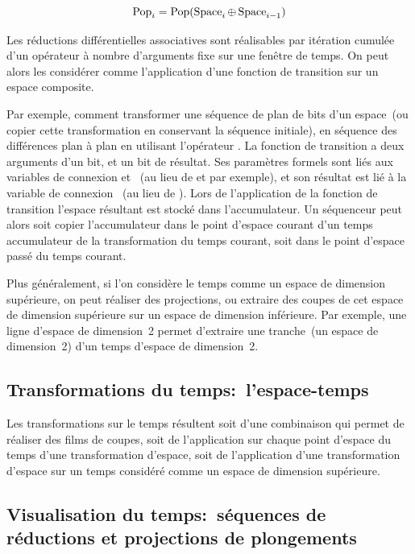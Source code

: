 \[\operatorname{Pop}_{i}=\operatorname{Pop}(\operatorname{Space}_{i}\oplus\operatorname{Space}_{i-1})\]

Les réductions différentielles associatives sont réalisables par
itération cumulée d'un opérateur à nombre d'arguments fixe sur une
fenêtre de temps. %
On peut alors les considérer comme l'application d'une fonction de
transition sur un espace composite. %

Par exemple, comment transformer une séquence de plan de bits d'un
espace~(ou copier cette transformation en conservant la séquence
initiale), en séquence des différences plan à plan en utilisant
l'opérateur \xor. %
 La fonction de transition  a deux
arguments d'un bit, et un bit de résultat. %
Ses paramètres formels sont liés aux variables de connexion
 et ~(au lieu de  et
 par exemple), et son résultat est lié à la variable de
connexion ~(au lieu de ). %
Lors de l'application de la fonction de transition l'espace résultant
est stocké dans l'accumulateur. %
Un séquenceur peut alors soit copier l'accumulateur dans le point
d'espace courant d'un temps accumulateur de la transformation du temps
courant, soit dans le point d'espace passé du temps courant. %

Plus généralement, si l'on considère le temps comme un espace de
dimension supérieure, on peut réaliser des projections, ou extraire
des coupes de cet espace de dimension supérieure sur un espace de
dimension inférieure. %
Par exemple, une ligne d'espace de dimension~2 permet d'extraire une
tranche~(un espace de dimension~2) d'un temps d'espace de dimension~2. %

\subsection{Transformations du temps:~l'espace-temps}

Les transformations sur le temps résultent soit d'une combinaison
 qui permet de réaliser des films de
coupes, soit de l'application sur chaque point d'espace du temps d'une
transformation d'espace, soit de l'application d'une transformation
d'espace sur un temps considéré comme un espace de dimension
supérieure. %

\subsection{Visualisation du temps:~séquences de réductions et
  projections de plongements}

